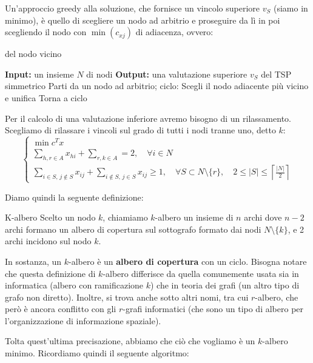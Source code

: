 \documentclass[a4paper,11pt]{article}
\begin{document}
Un'approccio greedy alla soluzione, che fornisce un vincolo superiore $v_S$ (siamo in minimo), è quello di scegliere un nodo ad arbitrio e proseguire da lì in poi scegliendo il nodo con $\min(c_{xj})$ di adiacenza, ovvero:

\begin{algorithm}[H]
\caption{del nodo vicino}
\begin{algorithmic}
	\STATE \textbf{Input:} un insieme $N$ di nodi %
	\STATE \textbf{Output:} una valutazione superiore $v_S$ del TSP simmetrico %
	\STATE Parti da un nodo ad arbitrio;
	\STATE \textsf{ciclo:}
	\STATE Scegli il nodo adiacente più vicino e unifica
	\STATE Torna a \textsf{ciclo}
	\ENDIF
\end{algorithmic}
\end{algorithm}

Per il calcolo di una valutazione inferiore avremo bisogno di un rilassamento.
Scegliamo di rilassare i vincoli sul grado di tutti i nodi tranne uno, detto $k$: 
\[
	\begin{cases}
		\min c^T x \\ 
		\sum\limits_{h,r \in A} x_{hi} + \sum\limits_{r,k \in A} = 2, \quad \forall i \in N \\
		\sum\limits_{i \in S, \, j \notin S} x_{ij} + \sum\limits_{i \notin S, \, j \in S} x_{ij} \geq 1, \quad \forall S \subset N \setminus \{r\}, \quad 2 \leq |S| \leq \left\lceil \frac{|N|}{2} \right\rceil
	\end{cases}
\]

Diamo quindi la seguente definizione:
\begin{definition}{K-albero}
	Scelto un nodo $k$, chiamiamo $k$-albero un insieme di $n$ archi dove $n-2$ archi formano un albero di copertura sul sottografo formato dai nodi $N \setminus \{k\}$, e 2 archi incidono sul nodo $k$.	
\end{definition}
In sostanza, un $k$-albero è un \textbf{albero di copertura} con un ciclo.
Bisogna notare che questa definizione di $k$-albero differisce da quella comunemente usata sia in informatica (albero con ramificazione $k$) che in teoria dei grafi (un altro tipo di grafo non diretto).
Inoltre, si trova anche sotto altri nomi, tra cui $r$-albero, che però è ancora conflitto con gli $r$-grafi informatici (che sono un tipo di albero per l'organizzazione di informazione spaziale).

Tolta quest'ultima precisazione, abbiamo che ciò che vogliamo è un $k$-albero minimo.
Ricordiamo quindi il seguente algoritmo:
\end{document}
